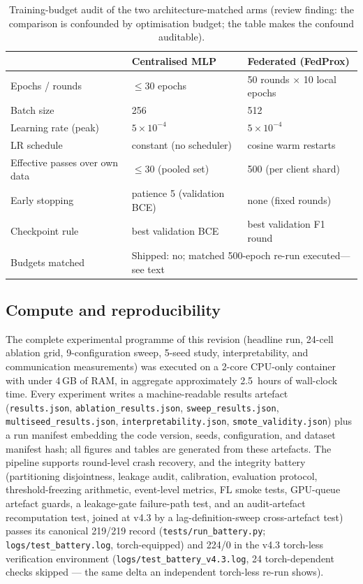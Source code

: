 \begin{table}[t]
\centering
\caption{Training-budget audit of the two architecture-matched arms
(review finding: the comparison is confounded by optimisation budget;
the table makes the confound auditable).}
\label{tab:budget}
\small
\begin{tabularx}{0.94\textwidth}{@{}>{\raggedright\arraybackslash}X l l@{}}
\toprule
 & \textbf{Centralised MLP} & \textbf{Federated (FedProx)} \\
\midrule
Epochs / rounds & $\le$30 epochs & 50 rounds $\times$ 10 local epochs \\
Batch size & 256 & 512 \\
Learning rate (peak) & $5\times10^{-4}$ & $5\times10^{-4}$ \\
LR schedule & constant (no scheduler) & cosine warm restarts \\
Effective passes over own data & $\le$30 (pooled set) & 500 (per client shard) \\
Early stopping & patience 5 (validation BCE) & none (fixed rounds) \\
Checkpoint rule & best validation BCE & best validation F1 round \\
Budgets matched & \multicolumn{2}{l}{Shipped: no; matched 500-epoch re-run executed---see text} \\
\bottomrule
\end{tabularx}
\end{table}

\subsection{Compute and reproducibility}
\label{sec:repro}

The complete experimental programme of this revision (headline run,
24-cell ablation grid, 9-configuration sweep, 5-seed study,
interpretability, and communication measurements) was executed on a
2-core CPU-only container with under 4\,GB of RAM, in aggregate
approximately 2.5~hours of wall-clock time. Every experiment writes a
machine-readable results artefact (\texttt{results.json},
\texttt{ablation\_results.json}, \texttt{sweep\_results.json},
\texttt{multiseed\_results.json}, \texttt{interpretability.json},
\texttt{smote\_validity.json}) plus a run manifest embedding the code
version, seeds, configuration, and dataset manifest hash; all figures
and tables are generated from these artefacts. The pipeline supports
round-level crash recovery, and the integrity battery (partitioning
disjointness, leakage audit, calibration, evaluation protocol,
threshold-freezing arithmetic, event-level metrics, FL smoke tests,
GPU-queue artefact guards, a leakage-gate failure-path test, and an
audit-artefact recomputation test, joined at v4.3 by a
lag-definition-sweep cross-artefact test)
passes its canonical 219/219 record (\texttt{tests/run\_battery.py};
\texttt{logs/test\_battery.log}, torch-equipped) and 224/0 in the
v4.3 torch-less verification environment
(\texttt{logs/test\_battery\_v4.3.log}, 24 torch-dependent checks
skipped --- the same delta an independent torch-less re-run shows).

